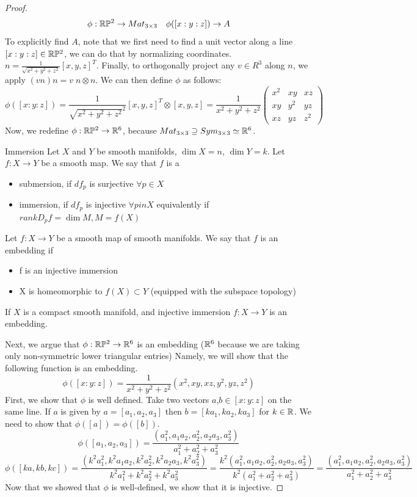 \documentclass[11pt,a4paper]{report}
\begin{document}
\begin{proof}
$$ \phi: \mathbb{R} \mathbb{P} ^2 \to Mat_{3 \times 3}  \quad \phi([x:y:z]) \to A $$
To explicitly find $A$, note that we first need to find a unit vector along a line $[x:y:z] \in \mathbb{R} \mathbb{P} ^2$,
we can do that by normalizing coordinates. $n = \frac{1}{\sqrt{x^2 + y^2 + z^2}} [x,y,z]^T $.
Finally, to orthogonally project any $v \in R^3$ along $n$, we apply $(v n) n = v \; n \otimes n$. We can then define $\phi$ as follows:
$$ \phi([x:y:z])  = \frac{1}{\sqrt{x^2+y^2+z^2}^2} [x,y,z]^T \otimes [x,y,z] = \frac{1}{x^2 + y^2 + z^2} 
\begin{pmatrix}
x^2 & xy & xz \\
xy & y^2 & yz  \\
xz & yz & z^2
\end{pmatrix} $$
Now, we redefine $\phi: \mathbb{R} \mathbb{P} ^2 \to \mathbb{R}^6$, because  $Mat_{3 \times 3} \supseteq Sym_{3 \times 3} \simeq \mathbb{R}^6$.
\begin{defn}{Immersion}
Let $X$ and $Y$ be smooth manifolds, $\dim X =n $, $\dim Y = k$. Let $f : X \to Y$ be a smooth map.
We say that $f$ is a
\begin{itemize}
    \item submersion, if $df_p$ is surjective $\forall p \in X$
    \item immersion, if $df_p$ is injective $\forall p in X$ equivalently if $rank D_p f = \dim M, M=f(X)$
\end{itemize}
\end{defn}
\begin{defn}
    Let $f: X \to Y$ be a smooth map of smooth manifolds. We say that $f$ is an embedding if 
    \begin{itemize}
        \item f is an injective immersion
        \item X is homeomorphic to $f(X) \subset Y$ (equipped with the subspace topology)
    \end{itemize}
\end{defn}

\begin{thm}
	If $X$ is a compact smooth manifold, and injective immersion $f:X\to Y$ is an embedding.
\end{thm}



Next, we argue that $\phi: \mathbb{R} \mathbb{P} ^2 \to \mathbb{R}^6$ is an embedding ($\mathbb{R}^6$ because we are taking only non-symmetric lower triangular entries)
Namely, we will show that the following function is an embedding.
$$ \phi([x:y:z]) = \frac{1}{x^2+y^2+z^2} (x^2,xy, xz, y^2, yz, z^2) $$
First, we show that $\phi$ is well defined. Take two vectors $a$,$b \in [x:y:z]$ on the same line.
If $a$ is given by $a=[a_1,a_2,a_3]$ then $b = [k a_1, k a_2, k a_3]$ for $k \in \mathbb{R}$. We need to show that 
$\phi([a]) = \phi([b])$.
$$\phi([a_1,a_2,a_3]) = \frac{(a_1^2, a_1a_2, a_2^2, a_2a_3, a_3^2)}{a_1^2+a_2^2+a_3^2}$$
$$\phi([ka,kb,kc]) = 
\frac{(k^2 a_1^2, k^2 a_1a_2, k^2 a_2^2, k^2 a_2a_3, k^2 a_3^2)}{k^2 a_1^2+ k^2 a_2^2+ k^2 a_3^2} 
=  \frac{ k^2 (a_1^2, a_1 a_2, a_2^2, a_2a_3, a_3^2) }{ k^2 (a_1^2+a_2^2+a_3^2)  }
= \frac{(a_1^2, a_1a_2, a_2^2, a_2a_3, a_3^2)}{a_1^2+a_2^2+a_3^2} $$
Now that we showed that $\phi$ is well-defined, we show that it is injective.


\end{proof}
\end{document}
